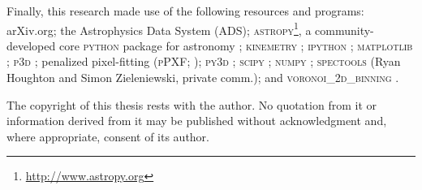 \begin{originalitylong}
Finally, this research made use of the following resources and programs: arXiv.org; the Astrophysics Data System (ADS); \textsc{astropy}\footnote{\url{http://www.astropy.org}}, a community-developed core \textsc{python} package for astronomy \citep{TheAstropyCollaboration2013}; \textsc{kinemetry} \citep{Krajnovic2006}; \textsc{ipython} \citep{Perez2007}; \textsc{matplotlib} \citep{Hunter2007}; \textsc{p3d} \citep{Sandin2010, Sandin2011}; penalized pixel-fitting (\textsc{pPXF}; \citealt{Cappellari2004}); \textsc{py3d} \citep{Sanchez2011, Husemann2013, Husemann2014}; \textsc{scipy} \citep{Oliphant2007, Millman2011}; \textsc{numpy} \citep{VanderWalt2011}; \textsc{spectools} (Ryan Houghton and Simon Zieleniewski, private comm.); and \textsc{voronoi\_2d\_binning} \citep[including the SAURON colourmaps; ][]{Cappellari2003}.

The copyright of this thesis rests with the author. No quotation from it or information derived from it may be published without acknowledgment and, where appropriate, consent of its author.
\end{originalitylong}